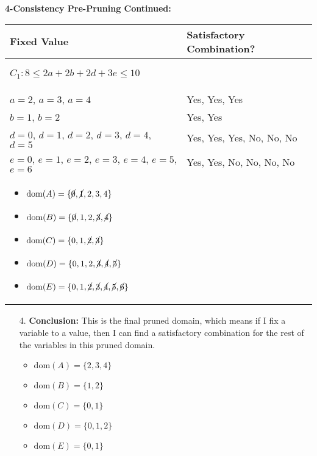 \begin{example} \textbf{4-Consistency Pre-Pruning Continued:}
    \begin{center}
        \begin{tabular}{ll}
            \textbf{Fixed Value} & \textbf{Satisfactory Combination?} \\
            \toprule
            \multicolumn{2}{p{\linewidth}}{
            \begin{center}
                $C_1: 8 \leq 2a + 2b + 2d + 3e \leq 10$
            \end{center}} \\
            \midrule
                $a=2$, $a=3$, $a=4$ & Yes, Yes, Yes \\
                $b=1$, $b=2$ & Yes, Yes \\
                $d=0$, $d=1$, $d=2$, $d=3$, $d=4$, $d=5$ & Yes, Yes, Yes, No, No, No \\
                $e=0$, $e=1$, $e=2$, $e=3$, $e=4$, $e=5$, $e=6$ & Yes, Yes, No, No, No, No \\
            \multicolumn{2}{p{\linewidth}}{
            \begin{itemize}
                \item $\text{dom}(A) = \{\cancel{0}, \cancel{1}, 2, 3, 4\}$
                \item $\text{dom}(B) = \{\cancel{0}, 1, 2, \cancel{3}, \cancel{4}\} $
                \item $\text{dom}(C) = \{0, 1, \cancel{2}, \cancel{3}\} $
                \item $\text{dom}(D) = \{0, 1, 2, \cancel{3}, \cancel{4}, \cancel{5}\} $
                \item $\text{dom}(E) = \{0, 1, \cancel{2}, \cancel{3}, \cancel{4}, \cancel{5}, \cancel{6}\} $
            \end{itemize}} \\
            \bottomrule
        \end{tabular}
        \vspace{1em}

        \begin{enumerate}
            \item[4. ] \textbf{Conclusion:} This is the final pruned domain, which means if I fix a variable to a value, then I can find a satisfactory combination for the rest of the variables in this pruned domain.
            \begin{itemize}
                \item $\text{dom}(A) = \{2, 3, 4\}$
                \item $\text{dom}(B) = \{1, 2\} $
                \item $\text{dom}(C) = \{0, 1\} $
                \item $\text{dom}(D) = \{0, 1, 2\} $
                \item $\text{dom}(E) = \{0, 1\} $
            \end{itemize}
        \end{enumerate}
    \end{center}
\end{example}
\newpage

